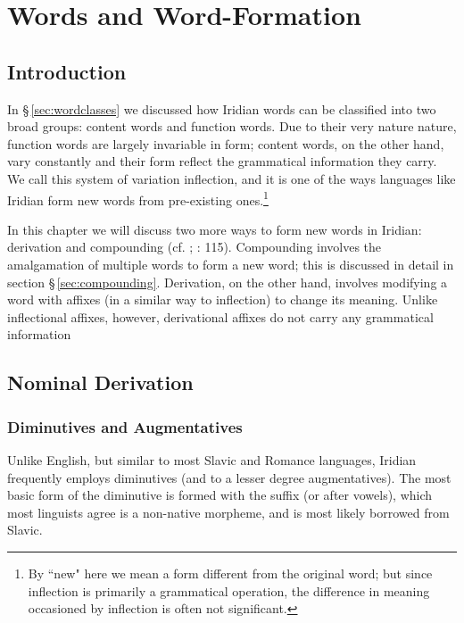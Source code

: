 \chapter{Words and Word-Formation}

\section{Introduction}

In \S\,\ref{sec:wordclasses} we discussed how Iridian words can be classified into two broad groups: content words and function words. Due to their very nature nature, function words are largely invariable in form; content words, on the other hand, vary constantly and their form reflect the grammatical information they carry. We call this system of variation {\sc inflection}, and it is one of the ways languages like Iridian form new words from pre-existing ones.\footnote{By ``new" here we mean a form different from the original word; but since inflection is primarily a grammatical operation, the difference in meaning occasioned by inflection is often not significant.}

In this chapter we will discuss two more ways to form new words in Iridian: {\sc derivation} and {\sc compounding} (cf. \cite{booij2005}; \cite{velupillai2012}: 115). Compounding involves the amalgamation of multiple words to form a new word; this is discussed in detail in section \S\,\ref{sec:compounding}. Derivation, on the other hand, involves modifying a word with affixes (in a similar way to inflection) to change its meaning. Unlike inflectional affixes, however, derivational affixes do not carry any grammatical information

\section{Nominal Derivation}
\subsection{Diminutives and Augmentatives}\label{sec:diminutive}

Unlike English, but similar to most Slavic and Romance languages, Iridian frequently employs {\sc diminutives} (and to a lesser degree {\sc augmentatives}). The most basic form of the diminutive is formed with the suffix  (or  after vowels), which most linguists agree is a non-native morpheme, and is most likely borrowed from Slavic.

